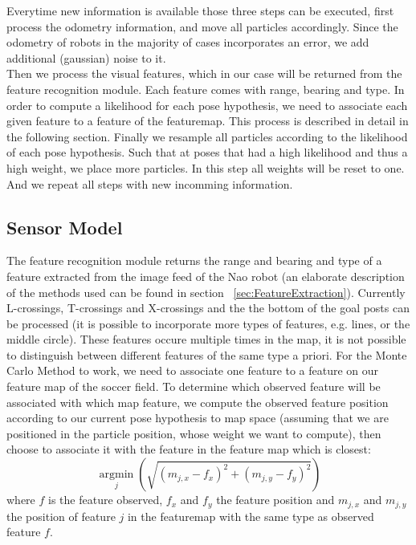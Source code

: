 \documentclass[	DIV=calc,%
							paper=a4,%
							fontsize=9pt,%
							twocolumn]{scrartcl}	 					%
\begin{document}
Everytime new information is available those three steps can be executed, first process the odometry information, and move all particles accordingly. Since the odometry of robots in the majority of cases incorporates an error, we add additional (gaussian) noise to it. \\
Then we process the visual features, which in our case will be returned from the feature recognition module. Each feature comes with range, bearing and type. In order to compute a likelihood for each pose hypothesis, we need to associate each given feature to a feature of the featuremap. This process is described in detail in the following section. Finally we resample all particles according to the likelihood of each pose hypothesis. Such that at poses that had a high likelihood and thus a high weight, we place more particles. In this step all weights will be reset to one. And we repeat all steps with new incomming information.

\subsection{Sensor Model}
\label{sec:SensorModel}
The feature recognition module returns the range and bearing and type of a feature extracted from the image feed of the Nao robot (an elaborate description of the methods used can be found in section ~\ref{sec:FeatureExtraction}). Currently L-crossings, T-crossings and X-crossings and the the bottom of the goal posts can be processed (it is possible to incorporate more types of features, e.g. lines, or the middle circle). These features occure multiple times in the map, it is not possible to distinguish between different features of the same type a priori. For the Monte Carlo Method to work, we need to associate one feature to a feature on our feature map of the soccer field. To determine which observed feature will be associated with which map feature, we compute the observed feature position according to our current pose hypothesis to map space (assuming that we are positioned in the particle position, whose weight we want to compute), then choose to associate it with the feature in the feature map which is closest:
\[\underset{j}{\operatorname{argmin}}  (\sqrt{(m_{j,x} - f_x)^2 + (m_{j,y} - f_y)^2})   \] 
where $f$ is the feature observed, $f_x$ and $f_y$ the feature position and $m_{j,x}$ and $m_{j,y}$ the position of feature $j$ in the featuremap with the same type as observed feature $f$. 
\end{document}
